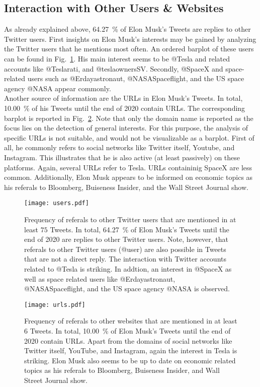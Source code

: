 \subsection{Interaction with Other Users \& Websites}

As already explained above, \SI{64.27}{\percent} of Elon Musk's Tweets are replies to other Twitter users. First insights on Elon Musk's interests may be gained by analyzing the Twitter users that he mentions  most often. An ordered barplot of these users can be found in Fig.~\ref{fig:users}. His main interest seems to be @Tesla and related accounts like @Teslarati, and @teslaownersSV. Secondly, @SpaceX and space-related users such as @Erdayastronaut, @NASASpaceflight, and the US space agency @NASA appear commonly.\\

Another source of information are the URLs in Elon Musk's Tweets. In total, \SI{10.00}{\percent} of his Tweets until the end of 2020 contain URLs. The corresponding barplot is reported in Fig.~\ref{fig:urls}. Note that only the domain name is reported as the focus lies on the detection of general interests. For this purpose, the analysis of specific URLs is not suitable, and would not be visualizable as a barplot. First of all, he commonly refers to social networks like Twitter itself, Youtube, and Instagram. This illustrates that he is also active (at least passively) on these platforms. Again, several URLs refer to Tesla. URLs containinig SpaceX are less common. Additionally, Elon Musk appears to be informed on economic topics as his referals to Bloomberg, Buiseness Insider, and the Wall Street Journal show.

\begin{figure}[h!]
\centering
\texttt{[image: users.pdf]}
\caption{Frequency of referals to other Twitter users that are mentioned in at least $75$ Tweets. In total, \SI{64.27}{\percent} of Elon Musk's Tweets until the end of 2020 are replies to other Twitter users. Note, however, that referals to other Twitter users (@user) are also possible in Tweets that are not a direct reply. The interaction with Twitter accounts related to @Tesla is striking. In addtion, an interest in @SpaceX as well as space related users like @Erdayastronaut, @NASASpaceflight, and the US space agency @NASA is observed.}
\label{fig:users}
\end{figure}

\clearpage

\begin{figure}[h!]
\centering
\texttt{[image: urls.pdf]}
\caption{Frequency of referals to other websites that are mentioned in at least $6$ Tweets. In total, \SI{10.00}{\percent} of Elon Musk's Tweets until the end of 2020 contain URLs. Apart from the domains of social networks like Twitter itself, YouTube, and Instagram, again the interest in Tesla is striking. Elon Musk also seems to be up to date on economic related topics as his referals to Bloomberg, Buiseness Insider, and Wall Street Journal show.}
\label{fig:urls}
\end{figure}

